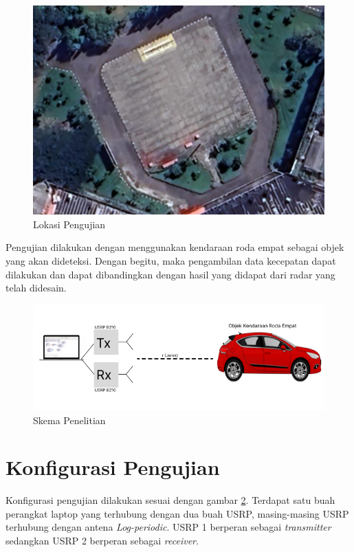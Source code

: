 \begin{figure}
	\begin{center}
		\includegraphics[scale=0.4]{pics/bab3/petaPengujian.png}
		\caption{Lokasi Pengujian}
		\label{img:petaUji}
	\end{center}
\end{figure}

Pengujian dilakukan dengan menggunakan kendaraan roda empat sebagai objek yang akan dideteksi. Dengan begitu, maka pengambilan data kecepatan dapat dilakukan dan dapat dibandingkan dengan hasil yang didapat dari radar yang telah didesain.

\begin{figure}
	\begin{center}
		\includegraphics[scale=0.4]{pics/bab3/skema.png}
		\caption{Skema Penelitian}
		\label{img:skema}
	\end{center}
\end{figure}

\section{Konfigurasi Pengujian}
Konfigurasi pengujian dilakukan sesuai dengan gambar \ref{img:skema}. Terdapat satu buah perangkat laptop yang terhubung dengan dua buah USRP, masing-masing USRP terhubung dengan antena \textit{Log-periodic}. USRP 1 berperan sebagai \textit{transmitter} sedangkan USRP 2 berperan sebagai \textit{receiver}.


